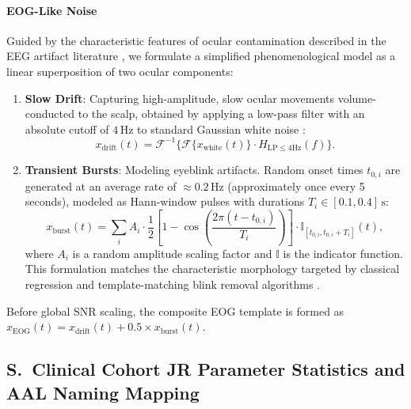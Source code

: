\documentclass[11pt]{article}
\newcounter{suppsec}
\renewcommand{\thesuppsec}{S\arabic{suppsec}}
\newcommand{\suppsubsection}[1]{%
  \refstepcounter{suppsec}%
  \subsection*{\thesuppsec.\ #1}%
}
\begin{document}
\paragraph{EOG-Like Noise}
Guided by the characteristic features of ocular contamination described in the EEG artifact literature \citep{elbert1985removal,croft2000eog}, we formulate a simplified phenomenological model as a linear superposition of two ocular components:
\begin{enumerate}
    \item \textbf{Slow Drift}: Capturing high-amplitude, slow ocular movements volume-conducted to the scalp, obtained by applying a low-pass filter with an absolute cutoff of $4\,\mathrm{Hz}$ to standard Gaussian white noise \citep{croft2000eog}:
    \begin{equation}
    x_{\mathrm{drift}}(t) = \mathcal{F}^{-1}\{\mathcal{F}\{x_{\mathrm{white}}(t)\} \cdot H_{\mathrm{LP}\le 4\mathrm{Hz}}(f)\}. \tag{S6.7}\label{eq:supp_eog_drift}
    \end{equation}
    \item \textbf{Transient Bursts}: Modeling eyeblink artifacts. Random onset times $t_{0,i}$ are generated at an average rate of $\approx 0.2\,\mathrm{Hz}$ (approximately once every 5 seconds), modeled as Hann-window pulses with durations $T_i \in [0.1, 0.4]\,\mathrm{s}$:
    \begin{equation}
    x_{\mathrm{burst}}(t) = \sum_i A_i \cdot \frac{1}{2} \left[1 - \cos\left(\frac{2\pi(t - t_{0,i})}{T_i}\right)\right] \cdot \mathbb{I}_{[t_{0,i}, t_{0,i}+T_i]}(t), \tag{S6.8}\label{eq:supp_eog_burst}
    \end{equation}
    where $A_i$ is a random amplitude scaling factor and $\mathbb{I}$ is the indicator function. This formulation matches the characteristic morphology targeted by classical regression and template-matching blink removal algorithms \citep{croft2000eog,li2006blink}.
\end{enumerate}
Before global SNR scaling, the composite EOG template is formed as $x_{\mathrm{EOG}}(t) = x_{\mathrm{drift}}(t) + 0.5 \times x_{\mathrm{burst}}(t)$.

\suppsubsection{Clinical Cohort JR Parameter Statistics and AAL Naming Mapping}
\label{sec:supp_jr_stats}
\end{document}
